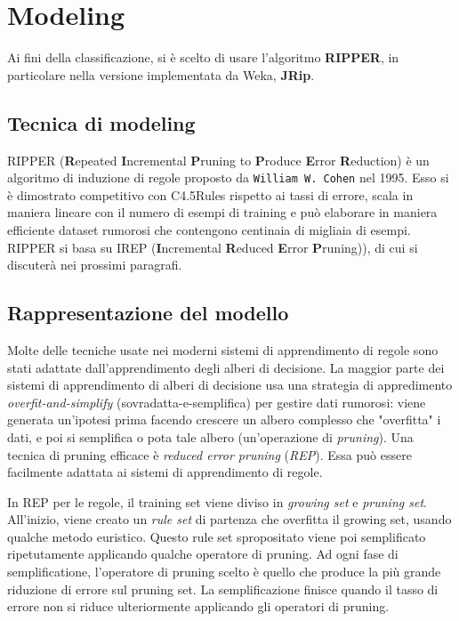 \chapter{Modeling}
\label{ch:model}
Ai fini della classificazione, si è scelto di usare l'algoritmo \textbf{RIPPER}\cite{Cohen95fasteffective}, in particolare nella versione implementata da Weka, \textbf{JRip}\cite{Witten:2011:DMP:1972514}.

\section{Tecnica di modeling}
RIPPER (\textbf{R}epeated \textbf{I}ncremental \textbf{P}runing to \textbf{P}roduce \textbf{E}rror \textbf{R}eduction) è un algoritmo di induzione di regole proposto da \verb|William W. Cohen| nel 1995. Esso si è dimostrato competitivo con C4.5Rules rispetto ai tassi di errore, scala in maniera lineare con il numero di esempi di training e può elaborare in maniera efficiente dataset rumorosi che contengono centinaia di migliaia di esempi. RIPPER si basa su IREP (\textbf{I}ncremental \textbf{R}educed \textbf{E}rror \textbf{P}runing))\cite{Furnkranz94incrementalreduced}, di cui si discuterà nei prossimi paragrafi.
\section{Rappresentazione del modello}
Molte delle tecniche usate nei moderni sistemi di apprendimento di regole  sono stati adattate dall'apprendimento degli alberi di decisione. La maggior parte dei sistemi di apprendimento di alberi di decisione usa una strategia di appredimento \textit{overfit-and-simplify} (sovradatta-e-semplifica) per gestire dati rumorosi: viene generata un'ipotesi prima facendo crescere un albero complesso che "overfitta" i dati, e poi si semplifica o pota tale albero (un'operazione di \textit{pruning}). Una tecnica di pruning efficace è \textit{reduced error pruning} (\textit{REP}). Essa può essere facilmente adattata ai sistemi di apprendimento di regole\cite{Pagallo1990}\cite{Brunk91aninvestigation}.

In REP per le regole, il training set viene diviso in \textit{growing set} e \textit{pruning set}. All'inizio, viene creato un \textit{rule set} di partenza che overfitta il growing set, usando qualche metodo euristico. Questo rule set spropositato viene poi semplificato ripetutamente applicando qualche operatore di pruning. Ad ogni fase di semplificatione, l'operatore di pruning scelto è quello che produce la più grande riduzione di errore sul pruning set. La semplificazione finisce quando il tasso di errore non si riduce ulteriormente applicando gli operatori di pruning.


